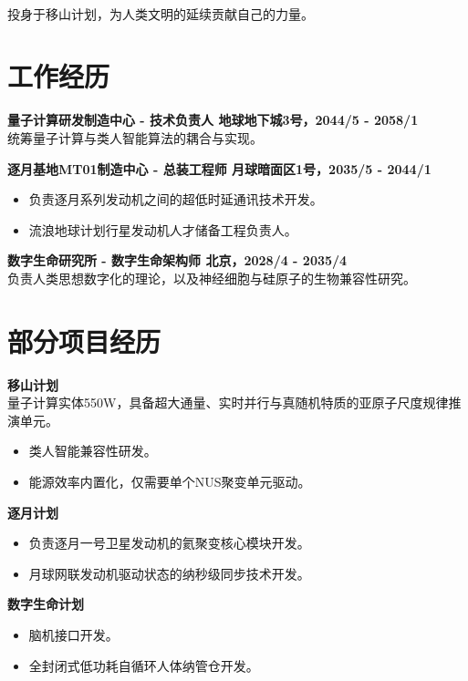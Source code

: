 \documentclass[10pt]{resume}
\begin{document}
\begin{center}
     ~  ~  ~  \\ [10pt]
\end{center}

投身于移山计划，为人类文明的延续贡献自己的力量。

\section{工作经历}
\textbf{量子计算研发制造中心 - 技术负责人 \hfill 地球地下城3号，2044/5 - 2058/1}\\
统筹量子计算与类人智能算法的耦合与实现。

\textbf{逐月基地MT01制造中心 - 总装工程师 \hfill 月球暗面区1号，2035/5 - 2044/1}
\begin{itemize}
    \item 负责逐月系列发动机之间的超低时延通讯技术开发。
    \item 流浪地球计划行星发动机人才储备工程负责人。
\end{itemize}

\textbf{数字生命研究所 - 数字生命架构师 \hfill 北京，2028/4 - 2035/4}\\
负责人类思想数字化的理论，以及神经细胞与硅原子的生物兼容性研究。


\section{部分项目经历}
\textbf{移山计划}\\
量子计算实体550W，具备超大通量、实时并行与真随机特质的亚原子尺度规律推演单元。
\begin{itemize}
    \item 类人智能兼容性研发。
    \item 能源效率内置化，仅需要单个NUS聚变单元驱动。
\end{itemize}

\textbf{逐月计划}
\begin{itemize}
    \item 负责逐月一号卫星发动机的氦聚变核心模块开发。
    \item 月球网联发动机驱动状态的纳秒级同步技术开发。
\end{itemize}

\textbf{数字生命计划}
\begin{itemize}
    \item 脑机接口开发。
    \item 全封闭式低功耗自循环人体纳管仓开发。
\end{itemize}
\end{document}
